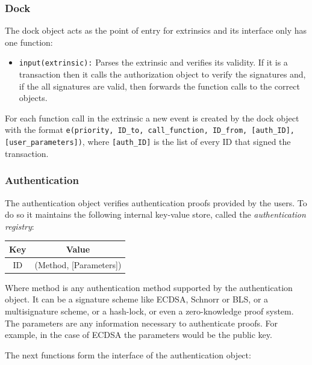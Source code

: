 \documentclass[conference]{IEEEtran}
\begin{document}
\subsubsection{Dock}
The dock object acts as the point of entry for extrinsics and its interface only has one function:

\begin{itemize}
	\item \texttt{input(extrinsic):} Parses the extrinsic and verifies its validity. If it is a transaction then it calls the authorization object to verify the signatures and, if the all signatures are valid, then forwards the function calls to the correct objects.
\end{itemize}

For each function call in the extrinsic a new event is created by the dock object with the format \texttt{e(priority, ID\_to, call\_function, ID\_from, [auth\_ID], [user\_parameters])}, where \texttt{[auth\_ID]} is the list of every ID that signed the transaction.

\subsubsection{Authentication}
The authentication object verifies authentication proofs provided by the users. To do so it maintains the following internal key-value store, called the \textit{authentication registry}:

\begin{center}
	\begin{tabular}[c]{c|c}
		Key & Value \\
		\hline
		ID & (Method, [Parameters]) \\
	\end{tabular}
\end{center}

Where method is any authentication method supported by the authentication object. It can be a signature scheme like ECDSA, Schnorr or BLS, or a multisignature scheme, or a hash-lock, or even a zero-knowledge proof system. The parameters are any information necessary to authenticate proofs. For example, in the case of ECDSA the parameters would be the public key.

The next functions form the interface of the authentication object:
\end{document}
